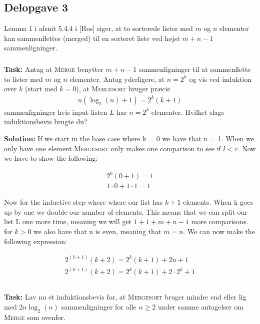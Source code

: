 \subsection{Delopgave 3}
Lemma 1 i afsnit 5.4.4 i [Ros] siger, at to sorterede lister med $m$ og $n$ elementer kan sammenflettes (merged) til en sorteret liste ved højst $m+n-1$ sammenligninger. 
\subsubsection{}
\textbf{Task:} Antag at \textsc{Merge} benytter $m+n-1$ sammenligninger til at sammenflette to lister med $m$ og $n$ elementer. Antag yderligere, at $n=2^k$ og vis ved induktion over $k$ (start med $k=0$), at \textsc{Mergesort} bruger præcis
	\begin{align*}
		n(\log_2(n)+1)=2^k(k+1)
	\end{align*}
sammenligninger hvis input-listen $L$ har $n=2^k$ elementer. Hvilket slags induktionsbevis brugte du?

\bigskip
\noindent
\textbf{Solution:} If we start in the base case where k = 0 we have that n = 1. When we only have one element \textsc{Mergesort} only makes one comparison to see if $l<r$. Now we have to show the following: 

\begin{equation}
    \begin{aligned}
        2^0(0+1)=1\\
        1\cdot0+1\cdot1=1
    \end{aligned}
\end{equation}

\noindent
Now for the inductive step where where our list has $k+1$ elements. When k goes up by one we double our number of elements. This means that we can split our list L one more time, meaning we will get $1+1+m+n-1$ more comparisons. for $k>0$ we also have that n is even, meaning that $m=n$. We can now make the following expression:

\begin{equation}
    \begin{aligned}
    2^{(k+1)}(k+2)=2^k(k+1)+2n+1\\
    2^{(k+1)}(k+2)=2^k(k+1)+2\cdot2^k+1\\
    \end{aligned}
\end{equation}

\subsubsection{}
\textbf{Task:} Lav nu et induktionsbevis for, at \textsc{Mergesort} bruger mindre end eller lig med $2n\log_2(n)$ sammenligninger for alle $n\geq 2$ under samme antagelser om \textsc{Merge} som ovenfor. 
	
